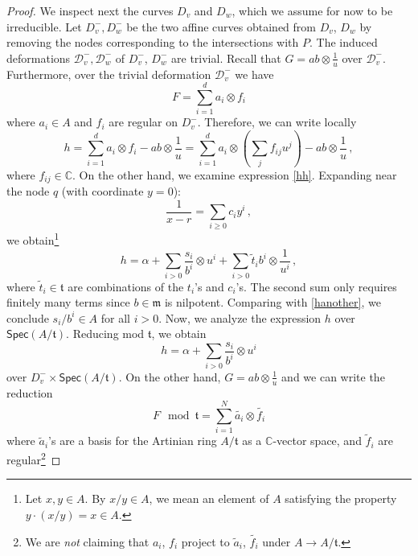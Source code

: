 \documentclass[11pt]{amsart}
\theoremstyle{definition}
\renewcommand{\tilde}{\widetilde}
\begin{document}
{\begin{proof}
We inspect next the curves $D_v$ and $D_w$, which we assume for now to be irreducible. Let $D^-_v, D^-_w$ be the two affine curves obtained from $D_v$, $D_w$ by removing the nodes corresponding to the intersections with $P$. The induced deformations $\mathcal D_v^-, \mathcal D_w^-$ of $D_v^-$, $D_w^-$ are trivial. Recall that $G=ab\otimes \frac{1}{u}$ over $\mathcal D_v^-$. Furthermore, over the trivial deformation $\mathcal D_v^-$ we have $$F=\sum_{i=1}^{d} a_i\otimes f_i$$ where $a_i\in A$ and $f_i$ are regular on $D_v^-$. Therefore, we can write locally \begin{equation}\label{hanother}h=\sum_{i=1}^{d} a_i\otimes f_i-ab\otimes \frac{1}{u}=\sum_{i=1}^{d} a_i\otimes \left(\sum_{j} f_{ij} u^j\right)-ab\otimes \frac{1}{u}\,,\end{equation} where $f_{ij} \in \mathbb C$. On the other hand, we examine expression \eqref{hh}. Expanding near the node $q$ (with coordinate $y=0$): $$\frac{1}{x-r}=\sum_{i\geq 0} c_i y^i\,,$$ we obtain{\footnote{Let $x,y\in A$. By $x/y\in A$, we mean an element of $A$ satisfying the property $y\cdot (x/y) =  x \in A$.}} 
$$h=\alpha+\sum_{i>0} \frac{s_i}{b^i}\otimes u^i+\sum_{i>0} \tilde t_i b^i \otimes \frac{1}{u^i}\,,$$ where $\tilde t_i\in \mathfrak t$ are combinations of the $t_i$'s and $c_i$'s. The second sum only requires finitely many terms since $b\in \mathfrak m$ is nilpotent. Comparing with \eqref{hanother}, we conclude 
$s_i/b^i\in A$ for all $i>0$. 
Now, we analyze the expression $h$ over $\textsf{Spec} (A/\mathfrak t)$. Reducing mod $\mathfrak t$, we obtain $$h=\alpha+\sum_{i>0} \frac{s_i}{b^i}\otimes u^i$$ over $D_v^-\times \textsf {Spec}(A/\mathfrak t)$. On the other hand, $G=ab\otimes \frac{1}{u}$ and we can write the reduction \begin{equation}\label{keyred}F\mod \mathfrak t=\sum_{i=1}^{N} \tilde{a_i}\otimes \tilde {f_i}\end{equation} where $\tilde a_i$'s are a basis for the Artinian ring $A/\mathfrak t$ as a $\mathbb C$-vector space, and $\tilde f_i$ are regular{\footnote{We are {\em not} claiming that $a_i$, $f_i$ project to $\tilde a_i$, $\tilde {f_i}$ under $A\to A/\mathfrak t$.}} 

\end{proof}}
\end{document}
